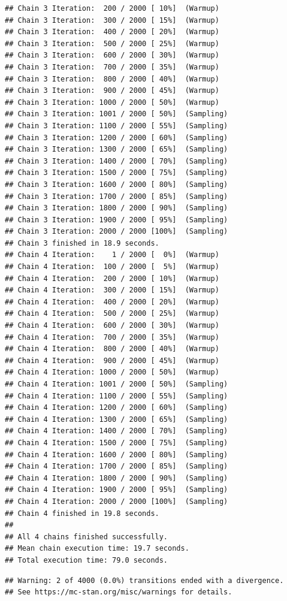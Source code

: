 \documentclass[
]{article}
\begin{document}
\begin{verbatim}
## Chain 3 Iteration:  200 / 2000 [ 10%]  (Warmup) 
## Chain 3 Iteration:  300 / 2000 [ 15%]  (Warmup) 
## Chain 3 Iteration:  400 / 2000 [ 20%]  (Warmup) 
## Chain 3 Iteration:  500 / 2000 [ 25%]  (Warmup) 
## Chain 3 Iteration:  600 / 2000 [ 30%]  (Warmup) 
## Chain 3 Iteration:  700 / 2000 [ 35%]  (Warmup) 
## Chain 3 Iteration:  800 / 2000 [ 40%]  (Warmup) 
## Chain 3 Iteration:  900 / 2000 [ 45%]  (Warmup) 
## Chain 3 Iteration: 1000 / 2000 [ 50%]  (Warmup) 
## Chain 3 Iteration: 1001 / 2000 [ 50%]  (Sampling) 
## Chain 3 Iteration: 1100 / 2000 [ 55%]  (Sampling) 
## Chain 3 Iteration: 1200 / 2000 [ 60%]  (Sampling) 
## Chain 3 Iteration: 1300 / 2000 [ 65%]  (Sampling) 
## Chain 3 Iteration: 1400 / 2000 [ 70%]  (Sampling) 
## Chain 3 Iteration: 1500 / 2000 [ 75%]  (Sampling) 
## Chain 3 Iteration: 1600 / 2000 [ 80%]  (Sampling) 
## Chain 3 Iteration: 1700 / 2000 [ 85%]  (Sampling) 
## Chain 3 Iteration: 1800 / 2000 [ 90%]  (Sampling) 
## Chain 3 Iteration: 1900 / 2000 [ 95%]  (Sampling) 
## Chain 3 Iteration: 2000 / 2000 [100%]  (Sampling) 
## Chain 3 finished in 18.9 seconds.
## Chain 4 Iteration:    1 / 2000 [  0%]  (Warmup) 
## Chain 4 Iteration:  100 / 2000 [  5%]  (Warmup) 
## Chain 4 Iteration:  200 / 2000 [ 10%]  (Warmup) 
## Chain 4 Iteration:  300 / 2000 [ 15%]  (Warmup) 
## Chain 4 Iteration:  400 / 2000 [ 20%]  (Warmup) 
## Chain 4 Iteration:  500 / 2000 [ 25%]  (Warmup) 
## Chain 4 Iteration:  600 / 2000 [ 30%]  (Warmup) 
## Chain 4 Iteration:  700 / 2000 [ 35%]  (Warmup) 
## Chain 4 Iteration:  800 / 2000 [ 40%]  (Warmup) 
## Chain 4 Iteration:  900 / 2000 [ 45%]  (Warmup) 
## Chain 4 Iteration: 1000 / 2000 [ 50%]  (Warmup) 
## Chain 4 Iteration: 1001 / 2000 [ 50%]  (Sampling) 
## Chain 4 Iteration: 1100 / 2000 [ 55%]  (Sampling) 
## Chain 4 Iteration: 1200 / 2000 [ 60%]  (Sampling) 
## Chain 4 Iteration: 1300 / 2000 [ 65%]  (Sampling) 
## Chain 4 Iteration: 1400 / 2000 [ 70%]  (Sampling) 
## Chain 4 Iteration: 1500 / 2000 [ 75%]  (Sampling) 
## Chain 4 Iteration: 1600 / 2000 [ 80%]  (Sampling) 
## Chain 4 Iteration: 1700 / 2000 [ 85%]  (Sampling) 
## Chain 4 Iteration: 1800 / 2000 [ 90%]  (Sampling) 
## Chain 4 Iteration: 1900 / 2000 [ 95%]  (Sampling) 
## Chain 4 Iteration: 2000 / 2000 [100%]  (Sampling) 
## Chain 4 finished in 19.8 seconds.
## 
## All 4 chains finished successfully.
## Mean chain execution time: 19.7 seconds.
## Total execution time: 79.0 seconds.
\end{verbatim}

\begin{verbatim}
## Warning: 2 of 4000 (0.0%) transitions ended with a divergence.
## See https://mc-stan.org/misc/warnings for details.
\end{verbatim}
\end{document}
